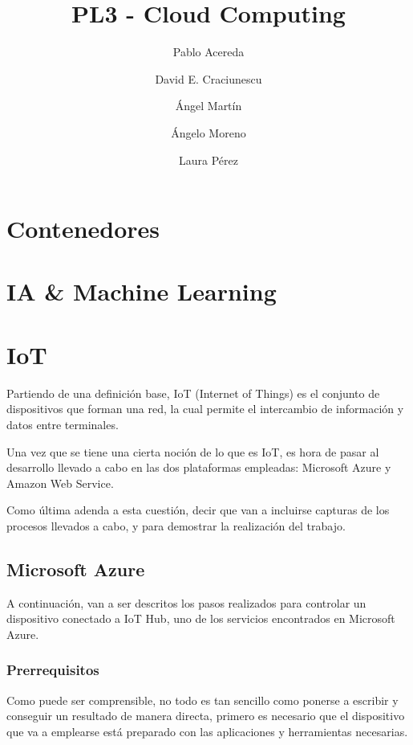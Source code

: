 \documentclass[10pt]{article}
\begin{document}
\title{PL3 - Cloud Computing}

\author{Pablo Acereda \and
David E. Craciunescu \and
Ángel Martín \and
Ángelo Moreno \and
Laura Pérez
}


\maketitle

\section{Contenedores}

\section{IA \& Machine Learning}

\section{IoT}

Partiendo de una definición base, IoT (Internet of Things) es el conjunto de
dispositivos que forman una red, la cual permite el intercambio de información y
datos entre terminales.

Una vez que se tiene una cierta noción de lo que es IoT, es hora de pasar al
desarrollo llevado a cabo en las dos plataformas empleadas: Microsoft Azure y
Amazon Web Service.

Como última adenda a esta cuestión, decir que van a incluirse capturas de los
procesos llevados a cabo, y para demostrar la realización del trabajo.

\subsection*{Microsoft Azure}

A continuación, van a ser descritos los pasos realizados para controlar un
dispositivo conectado a IoT Hub, uno de los servicios encontrados en Microsoft
Azure.

\subsubsection{Prerrequisitos}

Como puede ser comprensible, no todo es tan sencillo como ponerse a escribir y
conseguir un resultado de manera directa, primero es necesario que el
dispositivo que va a emplearse está preparado con las aplicaciones y
herramientas necesarias.
\end{document}
